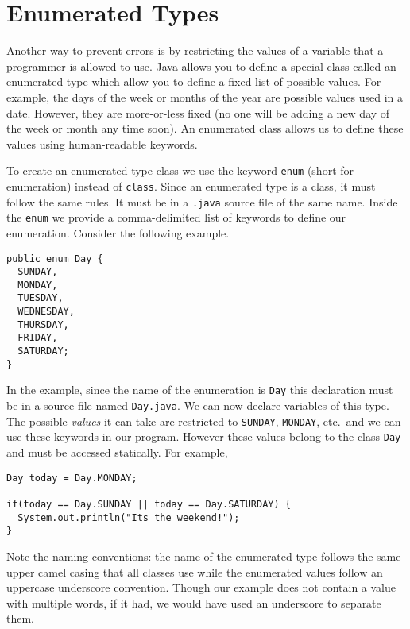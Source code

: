 \section{Enumerated Types}

Another way to prevent errors is by restricting the values of a 
variable that a programmer is allowed to use.  Java allows you to 
define a special class called an 
\gls{enumerated type} which allow you to define a fixed
list of possible values.  For example, the days of the
week or months of the year are possible values used in a date.
However, they are more-or-less fixed (no one will be adding a new
day of the week or month any time soon).  An enumerated 
class allows us to define these values using human-readable 
keywords.

To create an enumerated type class we use the keyword 
\texttt{enum} (short for enumeration) instead of 
\texttt{class}.  Since an
enumerated type is a class, it must follow the same rules.
It must be in a \texttt{.java} source file of the same
name.  Inside the \texttt{enum} we provide a comma-delimited 
list of keywords to define our enumeration.  
Consider the following example.

\begin{verbatim}
public enum Day {
  SUNDAY,
  MONDAY,
  TUESDAY,
  WEDNESDAY,
  THURSDAY,
  FRIDAY,
  SATURDAY;
}
\end{verbatim}

In the example, since the name of the enumeration is 
\texttt{Day} this declaration must be in a source file
named \texttt{Day.java}.  We can now declare 
variables of this type.  The possible \emph{values} it can 
take are restricted to \texttt{SUNDAY}, 
\texttt{MONDAY}, etc.\ and we can use these keywords 
in our program.  However these values belong to the
class \texttt{Day} and must be accessed statically.
For example,

\begin{verbatim}
Day today = Day.MONDAY;

if(today == Day.SUNDAY || today == Day.SATURDAY) {
  System.out.println("Its the weekend!");
}
\end{verbatim}

Note the naming conventions: the name of the enumerated type
follows the same upper camel casing that all classes use while 
the enumerated values follow an uppercase underscore convention.  
Though our example does not contain a value with multiple words, 
if it had, we would have used an underscore to separate them.  


